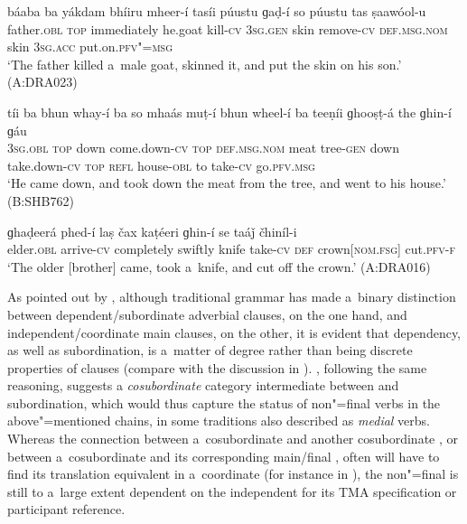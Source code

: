 \begin{exe}
\ex
\label{ex:13-44}
\gll \label{bkm:Ref190770484}{\ob}báaba ba yákdam bhíiru mheer-í{\cb} {\ob}tasíi púustu ɡaḍ-í{\cb} so púustu tas ṣaawóol-u  \\
father.\textsc{obl} \textsc{top} immediately he.goat kill-\textsc{cv} \textsc{3sg.gen} skin  remove-\textsc{cv} \textsc{def.msg.nom} skin \textsc{3sg.acc} put.on.\textsc{pfv"=msg} \\
\glt `The father killed a~male goat, skinned it, and put the skin on his son.' (A:DRA023)

\ex
\label{ex:13-45}
\gll tíi ba {\ob}bhun whay-í ba{\cb} {\ob}so  mhaás muṭ-í bhun wheel-í ba{\cb} {\ob}teeṇíi
  ɡhooṣṭ-á the ɡhin-í{\cb} ɡáu \\
\textsc{3sg.obl} \textsc{top} down come.down-\textsc{cv} \textsc{top} \textsc{def.msg.nom}  meat tree-\textsc{gen} down take.down-\textsc{cv} \textsc{top} \textsc{refl} house-\textsc{obl}  to take-\textsc{cv} go.\textsc{pfv.msg} \\
\glt `He came down, and took down the meat from the tree, and went to his house.' (B:SHB762)

\ex
\label{ex:13-46}
\gll ɡhaḍeerá {\ob}phed-í{\cb} {\ob}laṣ čax kaṭéeri ɡhin-í{\cb} se taáǰ čhiníl-i \\
elder.\textsc{obl} arrive-\textsc{cv} completely swiftly knife take-\textsc{cv}  \textsc{def} crown[\textsc{nom.fsg}] cut.\textsc{pfv-f}\\
\glt `The older [brother] came, took a~knife, and cut off the crown.' (A:DRA016) 
\end{exe}

As pointed out by \citet[327-8]{givon2001b}, although traditional grammar has made a~binary distinction between dependent/subordinate adverbial clauses, on the one hand, and independent/coordinate main clauses, on the other, it is evident that dependency, as well as subordination, is a~matter of degree rather than being discrete properties of clauses (compare with the discussion in \citet[]{cristofaro2005}). \citet[20--27]{haspelmath1995}, following the same reasoning, suggests a \textit{cosubordinate} category intermediate between  and subordination, which would thus capture the status of non"=final verbs in the above"=mentioned chains, in some traditions also described as \textit{medial} verbs. Whereas the connection between a~cosubordinate  and another cosubordinate , or between a~cosubordinate  and its corresponding main/final , often will have to find its translation equivalent in a~coordinate  (for instance in \iliEnglish), the non"=final  is still to a~large extent dependent on the independent  for its TMA specification or participant reference.




